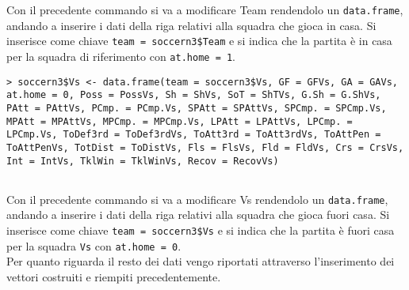 \bigskip
Con il precedente commando si va a modificare \textsf{Team} rendendolo un \texttt{data.frame}, andando a inserire i dati della riga relativi alla squadra che gioca in casa. Si inserisce come chiave \texttt{team = soccern3\$Team} e si indica che la partita è in casa per la squadra di riferimento con \texttt{at.home = 1}.
\bigskip
\bigskip
\begin{lstlisting}
> soccern3$Vs <- data.frame(team = soccern3$Vs, GF = GFVs, GA = GAVs, at.home = 0, Poss = PossVs, Sh = ShVs, SoT = ShTVs, G.Sh = G.ShVs, PAtt = PAttVs, PCmp. = PCmp.Vs, SPAtt = SPAttVs, SPCmp. = SPCmp.Vs, MPAtt = MPAttVs, MPCmp. = MPCmp.Vs, LPAtt = LPAttVs, LPCmp. = LPCmp.Vs, ToDef3rd = ToDef3rdVs, ToAtt3rd = ToAtt3rdVs, ToAttPen = ToAttPenVs, TotDist = ToDistVs, Fls = FlsVs, Fld = FldVs, Crs = CrsVs, Int = IntVs, TklWin = TklWinVs, Recov = RecovVs)
	
\end{lstlisting}
\bigskip
Con il precedente commando si va a modificare \textsf{Vs} rendendolo un \texttt{data.frame}, andando a inserire i dati della riga relativi alla squadra che gioca fuori casa. Si inserisce come chiave \texttt{team = soccern3\$Vs} e si indica che la partita è fuori casa per la squadra \texttt{Vs} con \texttt{at.home = 0}.\\ Per quanto riguarda il resto dei dati vengo riportati attraverso l'inserimento dei vettori costruiti e riempiti precedentemente.\\
